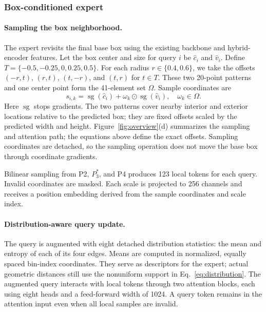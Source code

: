 \subsubsection{Box-conditioned expert}


\paragraph{Sampling the box neighborhood.}
The expert revisits the final base box using the existing backbone and hybrid-encoder features. Let the box center and size for query $i$ be $\hat c_i$ and $\hat v_i$. Define $T=\{-0.5,-0.25,0,0.25,0.5\}$. For each radius $r\in\{0.4,0.6\}$, we take the offsets $(-r,t)$, $(r,t)$, $(t,-r)$, and $(t,r)$ for $t\in T$. These two 20-point patterns and one center point form the 41-element set $\Omega$. Sample coordinates are
\begin{equation}
s_{i,k}=\operatorname{sg}(\hat c_i)+
\omega_k\odot\operatorname{sg}(\hat v_i),\quad\omega_k\in\Omega.
\label{eq:sampling}
\end{equation}
Here $\operatorname{sg}$ stops gradients. The two patterns cover nearby interior and exterior locations relative to the predicted box; they are fixed offsets scaled by the predicted width and height. Figure~\ref{fig:overview}(d) summarizes the sampling and attention path; the equations above define the exact offsets. Sampling coordinates are detached, so the sampling operation does not move the base box through coordinate gradients.

Bilinear sampling from P2, $P_3^{*}$, and P4 produces 123 local tokens for each query. Invalid coordinates are masked. Each scale is projected to 256 channels and receives a position embedding derived from the sample coordinates and scale index.

\paragraph{Distribution-aware query update.}
The query is augmented with eight detached distribution statistics: the mean and entropy of each of its four edges. Means are computed in normalized, equally spaced bin-index coordinates. They serve as descriptors for the expert; actual geometric distances still use the nonuniform support in Eq.~\eqref{eq:distribution}. The augmented query interacts with local tokens through two attention blocks, each using eight heads and a feed-forward width of 1024. A query token remains in the attention input even when all local samples are invalid.

